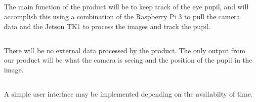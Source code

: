 
\subsection{}
The main function of the product will be to keep track of the eye pupil, and will accomplish this using a combination of the Raspberry Pi 3 to pull the camera data and the Jetson TK1 to process the images and track the pupil. 
\newline

\subsection{}
There will be no external data processed by the product.
The only output from our product will be what the camera is seeing and the position of the pupil in the image.
\newline

\subsection{}
A simple user interface may be implemented depending on the availabilty of time. 
